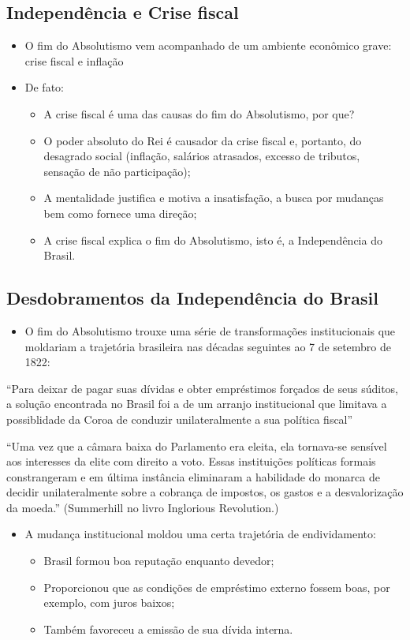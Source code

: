 \documentclass[a4paper,12pt]{article}[abntex2]
\begin{document}
\subsection{\textbf{Independência e Crise fiscal}}
\begin{itemize}
    \item O fim do Absolutismo vem acompanhado de um ambiente
econômico grave: crise fiscal e inflação
\item De fato: 
\begin{itemize}
    \item A crise fiscal é uma das causas do fim do Absolutismo, por que?
    \item O poder absoluto do Rei é causador da crise fiscal e, portanto, do
desagrado social (inflação, salários atrasados, excesso de tributos, sensação de não participação);
\item  A mentalidade justifica e motiva a insatisfação, a busca por mudanças bem como fornece uma direção;
\item A crise fiscal explica o fim do Absolutismo, isto é, a Independência do
Brasil.
\end{itemize}
\end{itemize}
\subsection{\textbf{Desdobramentos da Independência do Brasil}}
\begin{itemize}
    \item O fim do Absolutismo trouxe uma série de transformações institucionais que moldariam a trajetória brasileira nas décadas seguintes ao 7 de setembro de 1822:

\end{itemize}
“Para deixar de pagar suas dívidas e obter empréstimos forçados de seus súditos, a solução encontrada no Brasil foi a de um arranjo institucional que limitava a possiblidade da Coroa de conduzir unilateralmente a sua política fiscal”

“Uma vez que a câmara baixa do Parlamento era eleita, ela tornava-se
sensível aos interesses da elite com direito a voto. Essas instituições políticas formais constrangeram e em última instância eliminaram a habilidade do monarca de decidir unilateralmente sobre a cobrança de impostos, os gastos e a desvalorização da moeda.” (Summerhill no livro Inglorious Revolution.)
\begin{itemize}
    \item A mudança institucional moldou uma certa trajetória de endividamento:
    \begin{itemize}
        \item  Brasil formou boa reputação enquanto devedor; 
        \item Proporcionou que as condições de empréstimo externo fossem boas, por exemplo, com juros baixos;
        \item Também favoreceu a emissão de sua dívida interna.
    \end{itemize}
\end{itemize}
\newpage
\end{document}
